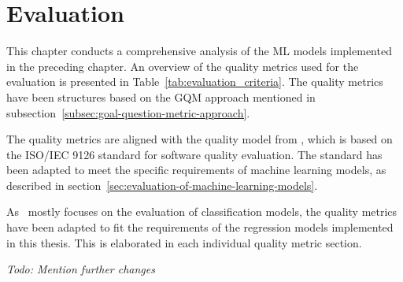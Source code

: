 \chapter{Evaluation}\label{ch:evaluation}
This chapter conducts a comprehensive analysis of the \ac{ML} models implemented in
the preceding chapter.
An overview of the quality metrics used for the evaluation is presented in
Table~\ref{tab:evaluation_criteria}. The quality metrics have been structures based on
the \ac{GQM}
approach mentioned in subsection~\ref{subsec:goal-question-metric-approach}.

The quality metrics are aligned with the quality model from \cite{
    siebert2022construction}, which is based on the ISO/IEC 9126 standard for software
quality evaluation. The standard has been adapted to meet the specific requirements of
machine learning models, as described in
section~\ref{sec:evaluation-of-machine-learning-models}.

As~\cite{siebert2022construction} mostly focuses on the evaluation of classification
models, the quality metrics have been adapted to fit the requirements of the regression
models implemented in this thesis.
This is elaborated in each individual quality metric section.

\textit{Todo: Mention further changes}

